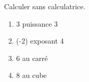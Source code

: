 \documentclass[exercice]{thedocument}%
\begin{document}
%
Calculer sans calculatrice.
\begin{enumerate}
    \item 3 puissance 3
    \item (-2) exposant 4
    \item 6 au carré
    \item 8 au cube
\end{enumerate}
\end{document}
